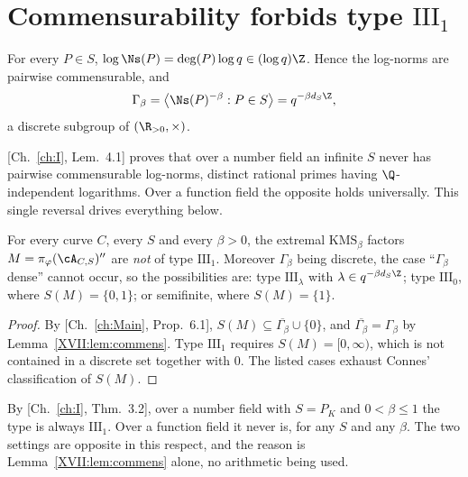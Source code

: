 \section{Commensurability forbids type $\mathrm{III}_1$}

\begin{lemma}\label{XVII:lem:commens}
For every $P\in S$, $\log\Ns(P)=\deg(P)\log q\in(\log q)\Z$. Hence the log-norms are
pairwise commensurable, and
\[
\Gamma_\beta=\bigl\langle\Ns(P)^{-\beta}:P\in S\bigr\rangle=q^{-\beta d_S\Z},
\]
a discrete subgroup of $(\R_{>0},\times)$.
\end{lemma}

\begin{remark}\label{XVII:rem:inversion}
[Ch.~\ref{ch:I}, Lem.~4.1] proves that over a number field an infinite $S$ never has pairwise
commensurable log-norms, distinct rational primes having $\Q$-independent logarithms. Over a
function field the opposite holds universally. This single reversal drives everything below.
\end{remark}

\begin{theorem}\label{XVII:thm:neverIII1}
For every curve $C$, every $S$ and every $\beta>0$, the extremal $\mathrm{KMS}_\beta$ factors
$M=\pi_\varphi(\cA_{C,S})''$ are \emph{not} of type $\mathrm{III}_1$. Moreover
$\Gamma_\beta$ being discrete, the case ``$\Gamma_\beta$ dense'' cannot occur, so the
possibilities are: type $\mathrm{III}_\lambda$ with $\lambda\in q^{-\beta d_S\Z}$; type
$\mathrm{III}_0$, where $S(M)=\{0,1\}$; or semifinite, where $S(M)=\{1\}$.
\end{theorem}

\begin{proof}
By [Ch.~\ref{ch:Main}, Prop.~6.1], $S(M)\subseteq\overline{\Gamma_\beta}\cup\{0\}$, and
$\overline{\Gamma_\beta}=\Gamma_\beta$ by Lemma~\ref{XVII:lem:commens}. Type $\mathrm{III}_1$
requires $S(M)=[0,\infty)$, which is not contained in a discrete set together with $0$. The
listed cases exhaust Connes' classification of $S(M)$.
\end{proof}

\begin{corollary}[Contrast]\label{XVII:cor:contrast}
By [Ch.~\ref{ch:I}, Thm.~3.2], over a number field with $S=P_K$ and $0<\beta\le1$ the type is
always $\mathrm{III}_1$. Over a function field it never is, for any $S$ and any $\beta$. The
two settings are opposite in this respect, and the reason is Lemma~\ref{XVII:lem:commens} alone,
no arithmetic being used.
\end{corollary}

